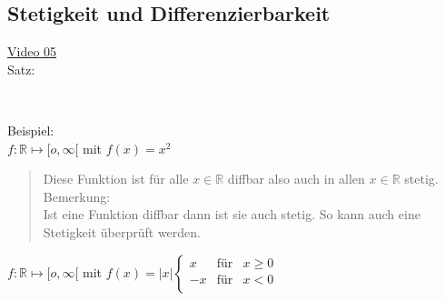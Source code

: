 \subsection{Stetigkeit und Differenzierbarkeit}
\href{https://youtu.be/Dx6XH3DJ3GA}{Video 05}\\
Satz:\\
\begin{center}
	\\
\end{center}
Beispiel:\\
\textbullet\;\;$ f:\mathbb{R}\longmapsto [o,\infty[ $ mit $ f(x)=x^2 $\\
\begin{quote}
	Diese Funktion ist für alle $ x\in \mathbb{R} $ diffbar also auch in allen $ x\in \mathbb{R} $ stetig.\vspace*{2mm}\\
	Bemerkung:\\
	Ist eine Funktion diffbar dann ist sie auch stetig. So kann auch eine Stetigkeit überprüft werden.\vspace*{2mm}\\
	
\end{quote}
\textbullet\;\;$ f:\mathbb{R}\longmapsto[o,\infty[ $ mit $ f(x) = |x|    \left\{ \begin{array}{rcl}
x & \mbox{für} & x\geq0\\
-x & \mbox{für} & x<0 \\

\end{array}\right. $
